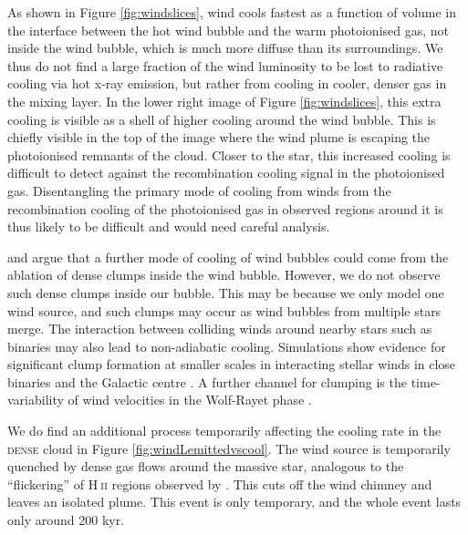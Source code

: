 \documentclass[a4paper,fleqn,usenatbib]{mnras}
\newcommand{\HII}{H$~$\textsc{ii}\xspace}
\begin{document}
As shown in Figure \ref{fig:windslices}, wind cools fastest as a function of volume in the interface between the hot wind bubble and the warm photoionised gas, not inside the wind bubble, which is much more diffuse than its surroundings. We thus do not find a large fraction of the wind luminosity to be lost to radiative cooling via hot x-ray emission, but rather from cooling in cooler, denser gas in the mixing layer. In the lower right image of Figure \ref{fig:windslices}, this extra cooling is visible as a shell of higher cooling around the wind bubble. This is chiefly visible in the top of the image where the wind plume is escaping the photoionised remnants of the cloud. Closer to the star, this increased cooling is difficult to detect against the recombination cooling signal in the photoionised gas. Disentangling the primary mode of cooling from winds from the recombination cooling of the photoionised gas in observed regions around it is thus likely to be difficult and would need careful analysis.

\cite{Rogers2013} and \cite{Dale2014} argue that a further mode of cooling of wind bubbles could come from the ablation of dense clumps inside the wind bubble. However, we do not observe such dense clumps inside our bubble. This may be because we only model one wind source, and such clumps may occur as wind bubbles from multiple stars merge. The interaction between colliding winds around nearby stars such as binaries may also lead to non-adiabatic cooling. Simulations show evidence for significant clump formation at smaller scales in interacting stellar winds in close binaries \citep{Calderon2020} and the Galactic centre \citep{Calderon2020a}. A further channel for clumping is the time-variability of wind velocities in the Wolf-Rayet phase \citep[see review by][]{Wade2011}.

We do find an additional process temporarily affecting the cooling rate in the \textsc{dense} cloud in Figure \ref{fig:windLemittedvscool}. The wind source is temporarily quenched by dense gas flows around the massive star, analogous to the ``flickering'' of \HII regions observed by \cite{Peters2010}. This cuts off the wind chimney and leaves an isolated plume. This event is only temporary, and the whole event lasts only around 200 kyr.
\end{document}
